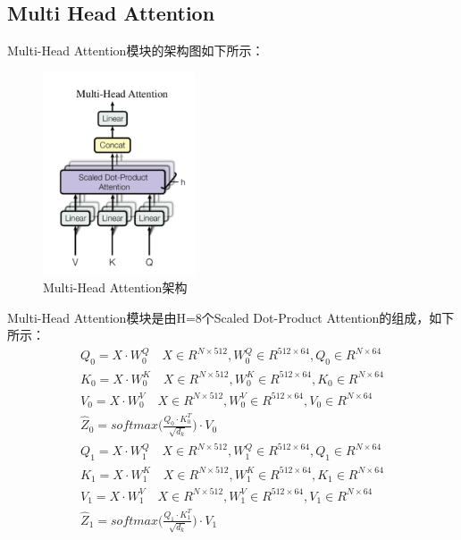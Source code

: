 \documentclass{article}
\begin{document}
\subsection{Multi Head Attention}
Multi-Head Attention模块的架构图如下所示：
\begin{figure}[H]
    \caption{Multi-Head Attention架构}
    \label{f000081}
    \centering
    \includegraphics[height=6cm]{images/f000081}
\end{figure}
Multi-Head Attention模块是由H=8个Scaled Dot-Product Attention的组成，如下所示：
\begin{equation}
\begin{aligned}
Q_{0} = X \cdot W^{Q}_{0} \quad X \in R^{N \times 512}, W^{Q}_{0} \in R^{512 \times 64}, Q_{0} \in R^{N \times 64} \\
K_{0} = X \cdot W^{K}_{0} \quad X \in R^{N \times 512}, W^{K}_{0} \in R^{512 \times 64}, K_{0} \in R^{N \times 64} \\
V_{0} = X \cdot W^{V}_{0} \quad X \in R^{N \times 512}, W^{V}_{0} \in R^{512 \times 64}, V_{0} \in R^{N \times 64} \\
\hat{Z}_{0} = softmax \bigg( \frac{Q_{0} \cdot K^{T}_{0}}{\sqrt{d_{k}}} \bigg) \cdot V_{0}
\end{aligned}
\label{e000113}
\end{equation}
\begin{equation}
\begin{aligned}
Q_{1} = X \cdot W^{Q}_{1} \quad X \in R^{N \times 512}, W^{Q}_{1} \in R^{512 \times 64}, Q_{1} \in R^{N \times 64} \\
K_{1} = X \cdot W^{K}_{1} \quad X \in R^{N \times 512}, W^{K}_{1} \in R^{512 \times 64}, K_{1} \in R^{N \times 64} \\
V_{1} = X \cdot W^{V}_{1} \quad X \in R^{N \times 512}, W^{V}_{1} \in R^{512 \times 64}, V_{1} \in R^{N \times 64} \\
\hat{Z}_{1} = softmax \bigg( \frac{Q_{1} \cdot K^{T}_{1}}{\sqrt{d_{k}}} \bigg) \cdot V_{1}
\end{aligned}
\label{e000114}
\end{equation}
\end{document}
